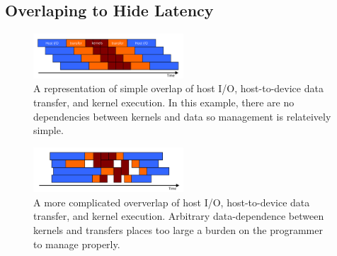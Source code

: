 \subsection{Overlaping to Hide Latency}



\begin{figure}[h!]
  \centering
    \includegraphics[width=0.5\textwidth]{fig/ordered.pdf}
  \caption{A representation of simple overlap of host I/O, host-to-device data
           transfer, and kernel execution. In this example, there are no
           dependencies between kernels and data so management is relateively
           simple.}
\end{figure}

\begin{figure}[h!]
  \centering
    \includegraphics[width=0.5\textwidth]{fig/unordered.pdf}
  \caption{A more complicated oververlap of host I/O, host-to-device data
           transfer, and kernel execution. Arbitrary data-dependence between
           kernels and transfers places too large a burden on the programmer
           to manage properly.}

\end{figure}

